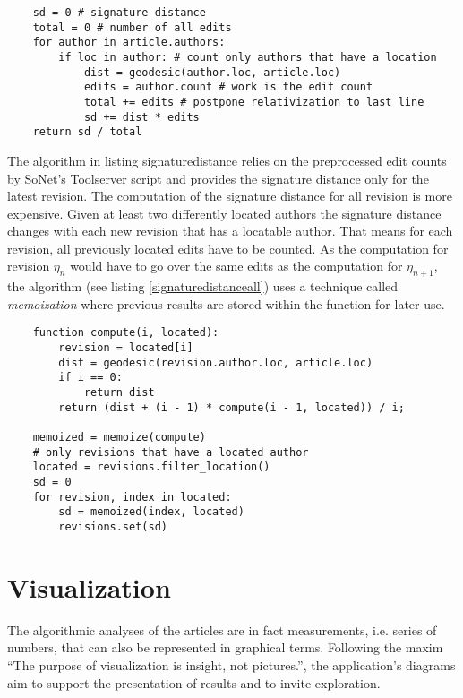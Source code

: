 \begin{lstlisting}
	sd = 0 # signature distance
	total = 0 # number of all edits
	for author in article.authors:
		if loc in author: # count only authors that have a location
			dist = geodesic(author.loc, article.loc)
			edits = author.count # work is the edit count
			total += edits # postpone relativization to last line 
			sd += dist * edits
	return sd / total
\end{lstlisting}

The algorithm in listing \refname{signaturedistance} relies on the preprocessed edit counts by SoNet's Toolserver script and provides the signature distance only for the latest revision. 
The computation of the signature distance for all revision is more expensive.
Given at least two differently located authors the signature distance changes with each new revision that has a locatable author.
That means for each revision, all previously located edits have to be counted.
As the computation for revision $\eta_{n}$ would have to go over the same edits as the computation for $\eta_{n+1}$, the algorithm (see listing \ref{signaturedistanceall}) uses a technique called \emph{memoization} where previous results are stored within the function for later use.

\begin{lstlisting}
	function compute(i, located):
		revision = located[i]
		dist = geodesic(revision.author.loc, article.loc)
		if i == 0:
			return dist
		return (dist + (i - 1) * compute(i - 1, located)) / i;
		
	memoized = memoize(compute)
	# only revisions that have a located author
	located = revisions.filter_location() 
	sd = 0
	for revision, index in located:
		sd = memoized(index, located)
		revisions.set(sd)
\end{lstlisting}

\section{Visualization}\label{sec:visualization}

The algorithmic analyses of the articles are in fact measurements, i.e. series of numbers, that can also be represented in graphical terms.
Following the maxim ``The purpose of visualization is insight, not pictures.''\cite[6]{card1999readings}, the application's diagrams aim to support the presentation of results and to invite exploration.

